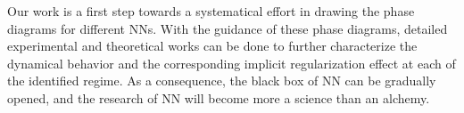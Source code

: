 \documentclass{article}
\begin{document}
Our work is a first step towards a systematical effort in drawing the phase diagrams for different NNs. With the guidance of these phase diagrams, detailed experimental and theoretical works can be done to further characterize the dynamical behavior and the corresponding implicit regularization effect at each of the identified regime. As a consequence, the black box of NN can be gradually opened, and the research of NN will become more a science than an alchemy.









\end{document}
